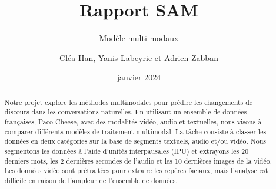 \documentclass[a4paper]{llncs}
\title{Rapport SAM}
\subtitle{Modèle multi-modaux}
\author{Cléa Han, Yanis Labeyrie et Adrien Zabban}
\institute{Ecole Centrale Méditerranée, 13013 Marseille, France}
\date{janvier 2024}
\begin{document}
\maketitle
\begin{abstract}
    Notre projet explore les méthodes multimodales pour prédire les changements de discours dans les conversations naturelles.
    En utilisant un ensemble de données françaises, Paco-Cheese, avec des modalités vidéo, audio et textuelles, nous visons à
    comparer différents modèles de traitement multimodal. La tâche consiste à classer les données en deux catégories sur la base
    de segments textuels, audio et/ou vidéo. Nous segmentons les données à l'aide d'unités interpausales (IPU) et extrayons les
    20 derniers mots, les 2 dernières secondes de l'audio et les 10 dernières images de la vidéo. Les données vidéo sont
    prétraitées pour extraire les repères faciaux, mais l'analyse est difficile en raison de l'ampleur de l'ensemble de données.
\end{abstract}
\end{document}
